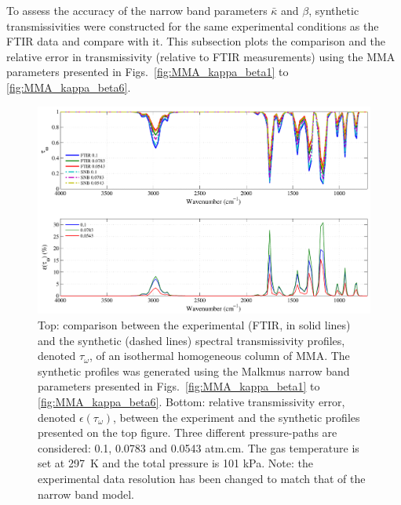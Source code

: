To assess the accuracy of the narrow band parameters $\bar{\kappa}$ and $\beta$, synthetic transmissivities were constructed for the same experimental conditions as the FTIR data and compare with it. This subsection plots the comparison and the relative error in transmissivity (relative to FTIR measurements) using the MMA parameters presented in Figs.~\ref{fig:MMA_kappa_beta1} to \ref{fig:MMA_kappa_beta6}.

\begin{figure}[!h]
\includegraphics[width=\textwidth]{Figures/Comparison_Fit_MMA_MALKMUS_Temp297K.pdf}
\caption{Top: comparison between the experimental (FTIR, in solid lines) and the synthetic (dashed lines) spectral transmissivity profiles, denoted $\tau_{\omega}$, of an isothermal homogeneous column of MMA. The synthetic profiles was generated using the Malkmus narrow band parameters presented in Figs.~\ref{fig:MMA_kappa_beta1} to \ref{fig:MMA_kappa_beta6}. Bottom: relative transmissivity error, denoted $\epsilon{(\tau_{\omega})}$, between the experiment and the synthetic profiles presented on the top figure. Three different pressure-paths are considered: 0.1, 0.0783 and 0.0543 atm.cm. The gas temperature is set at 297~K and the total pressure is 101 kPa. Note: the experimental data resolution has been changed to match that of the narrow band model. \label{fig:MMA_SNBVerify_297K}}
\end{figure}

